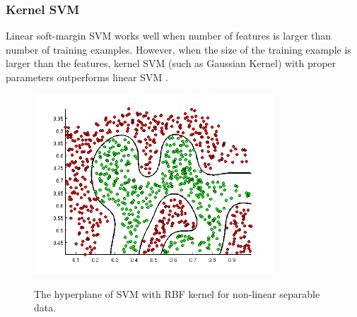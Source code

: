 \subsubsection{Kernel SVM}
Linear soft-margin SVM works well when number of features is larger than number of training examples. However, when the size of the training example is larger than the features, kernel SVM (such as Gaussian Kernel) with proper parameters outperforms linear SVM \cite{keerthi2003asymptotic}.
\begin{figure}
	\centering
	{\includegraphics[width = 0.8\textwidth]{relatedwork/fig/non-linear2.png}}
	\caption{The hyperplane of SVM with RBF kernel for non-linear separable data.}\label{fig:relate:nonlinear}
\end{figure}

